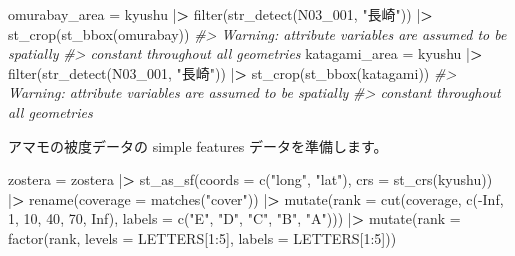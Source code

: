 \documentclass[
]{book}
\newenvironment{Shaded}{\begin{snugshade}}{\end{snugshade}}
\newcommand{\AttributeTok}[1]{\textcolor[rgb]{0.77,0.63,0.00}{#1}}
\newcommand{\CommentTok}[1]{\textcolor[rgb]{0.56,0.35,0.01}{\textit{#1}}}
\newcommand{\ConstantTok}[1]{\textcolor[rgb]{0.00,0.00,0.00}{#1}}
\newcommand{\DecValTok}[1]{\textcolor[rgb]{0.00,0.00,0.81}{#1}}
\newcommand{\ErrorTok}[1]{\textcolor[rgb]{0.64,0.00,0.00}{\textbf{#1}}}
\newcommand{\FunctionTok}[1]{\textcolor[rgb]{0.00,0.00,0.00}{#1}}
\newcommand{\NormalTok}[1]{#1}
\newcommand{\OtherTok}[1]{\textcolor[rgb]{0.56,0.35,0.01}{#1}}
\newcommand{\SpecialCharTok}[1]{\textcolor[rgb]{0.00,0.00,0.00}{#1}}
\newcommand{\StringTok}[1]{\textcolor[rgb]{0.31,0.60,0.02}{#1}}
\theoremstyle{definition}
\theoremstyle{definition}
\theoremstyle{definition}
\theoremstyle{definition}
\theoremstyle{remark}
\begin{document}
\begin{Shaded}
\begin{Highlighting}[]
\NormalTok{omurabay\_area }\OtherTok{=}\NormalTok{ kyushu }\SpecialCharTok{|}\ErrorTok{\textgreater{}} \FunctionTok{filter}\NormalTok{(}\FunctionTok{str\_detect}\NormalTok{(N03\_001, }\StringTok{"長崎"}\NormalTok{)) }\SpecialCharTok{|}\ErrorTok{\textgreater{}} \FunctionTok{st\_crop}\NormalTok{(}\FunctionTok{st\_bbox}\NormalTok{(omurabay)) }
\CommentTok{\#\textgreater{} Warning: attribute variables are assumed to be spatially}
\CommentTok{\#\textgreater{} constant throughout all geometries}
\NormalTok{katagami\_area }\OtherTok{=}\NormalTok{ kyushu }\SpecialCharTok{|}\ErrorTok{\textgreater{}} \FunctionTok{filter}\NormalTok{(}\FunctionTok{str\_detect}\NormalTok{(N03\_001, }\StringTok{"長崎"}\NormalTok{)) }\SpecialCharTok{|}\ErrorTok{\textgreater{}} \FunctionTok{st\_crop}\NormalTok{(}\FunctionTok{st\_bbox}\NormalTok{(katagami)) }
\CommentTok{\#\textgreater{} Warning: attribute variables are assumed to be spatially}
\CommentTok{\#\textgreater{} constant throughout all geometries}
\end{Highlighting}
\end{Shaded}

アマモの被度データの simple features データを準備します。

\begin{Shaded}
\begin{Highlighting}[]
\NormalTok{zostera }\OtherTok{=}\NormalTok{ zostera }\SpecialCharTok{|}\ErrorTok{\textgreater{}}
  \FunctionTok{st\_as\_sf}\NormalTok{(}\AttributeTok{coords =} \FunctionTok{c}\NormalTok{(}\StringTok{"long"}\NormalTok{, }\StringTok{"lat"}\NormalTok{), }\AttributeTok{crs =} \FunctionTok{st\_crs}\NormalTok{(kyushu)) }\SpecialCharTok{|}\ErrorTok{\textgreater{}} 
  \FunctionTok{rename}\NormalTok{(}\AttributeTok{coverage =} \FunctionTok{matches}\NormalTok{(}\StringTok{"cover"}\NormalTok{)) }\SpecialCharTok{|}\ErrorTok{\textgreater{}} 
  \FunctionTok{mutate}\NormalTok{(}\AttributeTok{rank =} \FunctionTok{cut}\NormalTok{(coverage, }
                    \FunctionTok{c}\NormalTok{(}\SpecialCharTok{{-}}\ConstantTok{Inf}\NormalTok{, }\DecValTok{1}\NormalTok{, }\DecValTok{10}\NormalTok{, }\DecValTok{40}\NormalTok{, }\DecValTok{70}\NormalTok{, }\ConstantTok{Inf}\NormalTok{),}
                    \AttributeTok{labels =} \FunctionTok{c}\NormalTok{(}\StringTok{"E"}\NormalTok{, }\StringTok{"D"}\NormalTok{, }\StringTok{"C"}\NormalTok{, }\StringTok{"B"}\NormalTok{, }\StringTok{"A"}\NormalTok{))) }\SpecialCharTok{|}\ErrorTok{\textgreater{}} 
  \FunctionTok{mutate}\NormalTok{(}\AttributeTok{rank =} \FunctionTok{factor}\NormalTok{(rank, }
                       \AttributeTok{levels =}\NormalTok{ LETTERS[}\DecValTok{1}\SpecialCharTok{:}\DecValTok{5}\NormalTok{],}
                       \AttributeTok{labels =}\NormalTok{ LETTERS[}\DecValTok{1}\SpecialCharTok{:}\DecValTok{5}\NormalTok{]))}
\end{Highlighting}
\end{Shaded}
\end{document}

